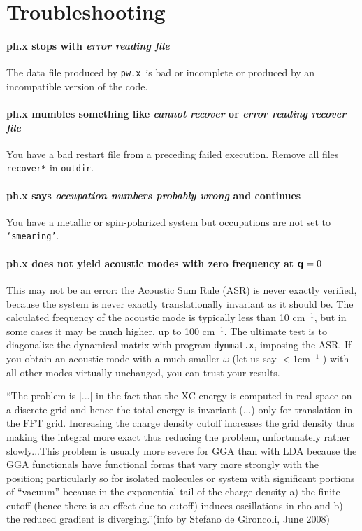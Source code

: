 \documentclass[12pt,a4paper]{article}
\def\pwx{\texttt{pw.x}}
\begin{document}
\section{Troubleshooting}

\paragraph{ph.x stops with {\em error reading file}}
The data file produced by \pwx\ is bad or incomplete or produced
by an incompatible version of the code.

\paragraph{ph.x mumbles something like {\em cannot recover} or {\em error
  reading recover file}} 
You have a bad restart file from a preceding failed execution.
Remove all files \texttt{recover*} in \texttt{outdir}.

\paragraph{ph.x says {\em occupation numbers probably wrong} and
 continues} You have a
metallic or spin-polarized system but occupations are not set to 
\texttt{`smearing'}.

\paragraph{ph.x does not yield acoustic modes with zero frequency at 
${\bf q}=0$}
This may not be an error: the Acoustic Sum Rule (ASR) is never exactly
verified, because the system is never exactly translationally
invariant as it should be.  The calculated frequency of the acoustic
mode is typically less than 10 cm$^{-1}$, but in some cases it may be
much higher, up to 100 cm$^{-1}$. The ultimate test is to diagonalize
the dynamical matrix with program \texttt{dynmat.x}, imposing the ASR. If you
obtain an acoustic mode with a much smaller $\omega$ (let us say 
$< 1 \mbox{cm}^{-1}$ ) 
with all other modes virtually unchanged, you can trust your results.

``The problem is [...] in the fact that the XC 
energy is computed in real space on a discrete grid and hence the
total energy is invariant (...) only for translation in the FFT
grid. Increasing the charge density cutoff increases the grid density
thus making the integral more exact thus reducing the problem,
unfortunately rather slowly...This problem is usually more severe for
GGA  than with LDA because the GGA functionals have functional forms
that vary more strongly with the position; particularly so for
isolated molecules or system with significant portions of ``vacuum''
because in the exponential tail of the charge density a) the finite
cutoff  (hence there is an effect due to cutoff) induces oscillations
in rho and b) the reduced gradient is diverging.''(info by Stefano de
Gironcoli, June 2008) 
\end{document}
